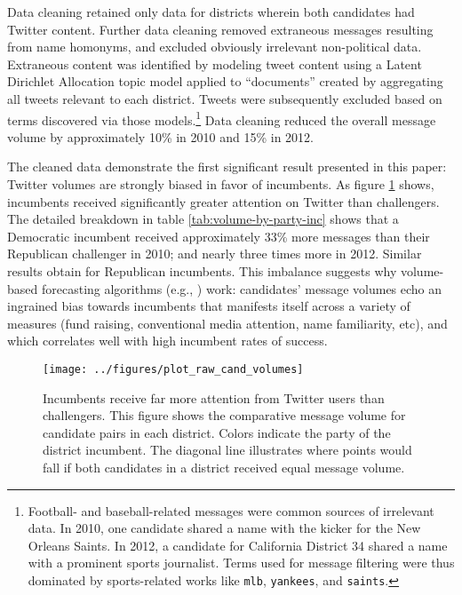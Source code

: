 \documentclass{article}
\begin{document}
Data cleaning retained only data for districts wherein both candidates
had Twitter content. Further data cleaning removed extraneous messages
resulting from name homonyms, and excluded obviously irrelevant
non-political data. Extraneous content was identified by modeling
tweet content using a Latent Dirichlet Allocation topic model
\citep{blei2003latent} applied to ``documents'' created by aggregating
all tweets relevant to each district. Tweets were subsequently
excluded based on terms discovered via those
models.\footnote{Football- and baseball-related messages were common
sources of irrelevant data. In 2010, one candidate shared a name with
the kicker for the New Orleans Saints. In 2012, a candidate for
California District 34 shared a name with a prominent sports
journalist. Terms used for message filtering were thus dominated by
sports-related works like \texttt{mlb},
\texttt{yankees}, and \texttt{saints}.} Data
cleaning reduced the overall message volume by approximately 10\% in
2010 and 15\% in 2012.

The cleaned data demonstrate the first significant result presented in
this paper: Twitter volumes are strongly biased in favor of
incumbents. As figure \ref{fig:cand-msg-volume} shows, incumbents
received significantly greater attention on Twitter than challengers.
The detailed breakdown in table \ref{tab:volume-by-party-inc} shows
that a Democratic incumbent received approximately 33\% more messages
than their Republican challenger in 2010; and nearly three times more
in 2012. Similar results obtain for Republican incumbents. This
imbalance suggests why volume-based forecasting algorithms (e.g.,
\cite{digrazia2013,tumasjan2010election,bermingham2011using}) work:
candidates' message volumes echo an ingrained bias towards incumbents
that manifests itself across a variety of measures (fund raising,
conventional media attention, name familiarity, etc), and which
correlates well with high incumbent rates of success. 


\begin{figure}[ht]
  \centering
  \texttt{[image: ../figures/plot\_raw\_cand\_volumes]}
  \caption{Incumbents receive far more attention from Twitter users
    than challengers. This figure shows the comparative message volume for
    candidate pairs in each district. Colors indicate the party of the
    district incumbent. The diagonal line illustrates where points would fall if both candidates in a district received equal message volume.}
  \label{fig:cand-msg-volume}
\end{figure}
\end{document}
